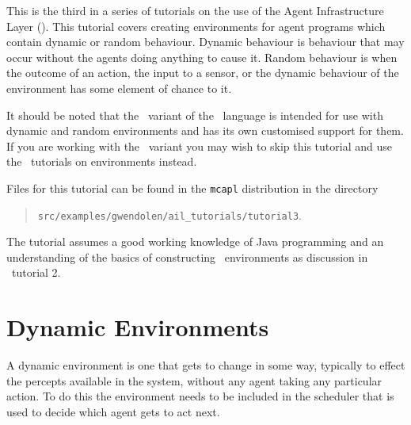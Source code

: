 \label{tutorial:ail:environments}

This is the third in a series of tutorials on the use of the Agent Infrastructure Layer (\ail).  This tutorial covers creating environments for agent programs which contain dynamic or random behaviour.   Dynamic behaviour is behaviour that may occur without the agents doing anything to cause it.  Random behaviour is when the outcome of an action, the input to a sensor, or the dynamic behaviour of the environment has some element of chance to it.

It should be noted that the \eass\ variant of the \gwendolen\ language is intended for use with dynamic and random environments and has its own customised support for them.  If you are working with the \eass\ variant you may wish to skip this tutorial and use the \eass\ tutorials on environments instead.

Files for this tutorial can be found in the \texttt{mcapl} distribution in the directory 
\begin{quote}
\texttt{src/examples/gwendolen/ail\_tutorials/tutorial3}.
\end{quote}

The tutorial assumes a good working knowledge of Java programming and an understanding of the basics of constructing \ail\ environments as discussion in \ail\ tutorial 2.

\section{Dynamic Environments}

A dynamic environment is one that gets to change in some way, typically to effect the percepts available in the system, without any agent taking any particular action.  To do this the environment needs to be included in the scheduler that is used to decide which agent gets to act next.

